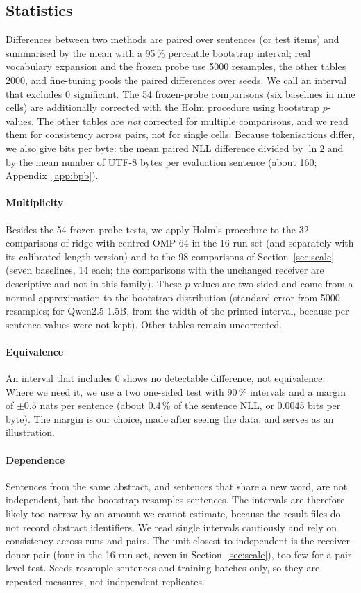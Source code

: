 \documentclass[preprint,12pt]{elsarticle}
\begin{document}
\subsection{Statistics}
\label{sec:stats}
Differences between two methods are paired over sentences (or test items) and summarised by the mean with a 95\,\% percentile bootstrap interval; real vocabulary expansion and the frozen probe use 5000 resamples, the other tables 2000, and fine-tuning pools the paired differences over seeds. We call an interval that excludes 0 significant. The 54 frozen-probe comparisons (six baselines in nine cells) are additionally corrected with the Holm procedure \cite{holm1979simple} using bootstrap $p$-values. The other tables are \emph{not} corrected for multiple comparisons, and we read them for consistency across pairs, not for single cells. Because tokenisations differ, we also give bits per byte: the mean paired NLL difference divided by $\ln 2$ and by the mean number of UTF-8 bytes per evaluation sentence (about 160; Appendix~\ref{app:bpb}).

\paragraph{Multiplicity} Besides the 54 frozen-probe tests, we apply Holm's procedure to the 32 comparisons of ridge with centred OMP-64 in the 16-run set (and separately with its calibrated-length version) and to the 98 comparisons of Section~\ref{sec:scale} (seven baselines, 14 each; the comparisons with the unchanged receiver are descriptive and not in this family). These $p$-values are two-sided and come from a normal approximation to the bootstrap distribution (standard error from 5000 resamples; for Qwen2.5-1.5B, from the width of the printed interval, because per-sentence values were not kept). Other tables remain uncorrected.

\paragraph{Equivalence} An interval that includes 0 shows no detectable difference, not equivalence. Where we need it, we use a two one-sided test with 90\,\% intervals and a margin of $\pm0.5$ nats per sentence (about 0.4\,\% of the sentence NLL, or 0.0045 bits per byte). The margin is our choice, made after seeing the data, and serves as an illustration.

\paragraph{Dependence} Sentences from the same abstract, and sentences that share a new word, are not independent, but the bootstrap resamples sentences. The intervals are therefore likely too narrow by an amount we cannot estimate, because the result files do not record abstract identifiers. We read single intervals cautiously and rely on consistency across runs and pairs. The unit closest to independent is the receiver--donor pair (four in the 16-run set, seven in Section~\ref{sec:scale}), too few for a pair-level test. Seeds resample sentences and training batches only, so they are repeated measures, not independent replicates.
\end{document}
